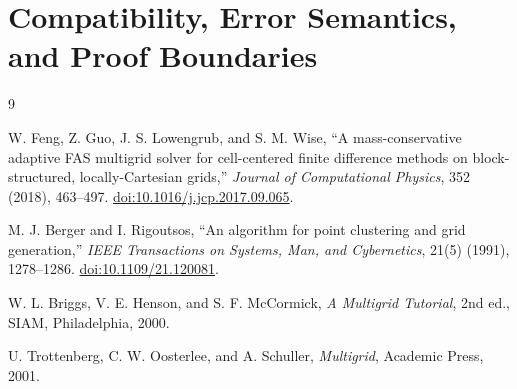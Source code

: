 \documentclass[11pt,oneside,openany]{book}
\begin{document}
\chapter{Compatibility, Error Semantics, and Proof Boundaries}
\label{app:audit}


\backmatter
\renewcommand{\bibname}{References}
{}
\begin{thebibliography}{9}

W. Feng, Z. Guo, J. S. Lowengrub, and S. M. Wise,
``A mass-conservative adaptive FAS multigrid solver for cell-centered finite difference methods on block-structured, locally-Cartesian grids,''
\emph{Journal of Computational Physics}, 352 (2018), 463--497.
\href{https://doi.org/10.1016/j.jcp.2017.09.065}{doi:10.1016/j.jcp.2017.09.065}.

M. J. Berger and I. Rigoutsos,
``An algorithm for point clustering and grid generation,''
\emph{IEEE Transactions on Systems, Man, and Cybernetics}, 21(5) (1991), 1278--1286.
\href{https://doi.org/10.1109/21.120081}{doi:10.1109/21.120081}.

W. L. Briggs, V. E. Henson, and S. F. McCormick,
\emph{A Multigrid Tutorial}, 2nd ed., SIAM, Philadelphia, 2000.

U. Trottenberg, C. W. Oosterlee, and A. Schuller,
\emph{Multigrid}, Academic Press, 2001.

\end{thebibliography}
\end{document}
